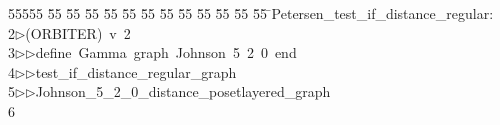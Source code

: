 %
%
\begin{tabbing}
55555 \= 55 \= 55 \= 55 \= 55 \= 55 \= 55 \= 55 \= 55 \= 55 \= 55 \= 55 \= 55 \= \>Petersen\_test\_if\_distance\_regular:\\[0pt]
2\>$\triangleright$\>(ORBITER)\ v\ 2\ \\[0pt]
3\>$\triangleright$\>$\triangleright$\>define\ Gamma\ graph\ Johnson\ 5\ 2\ 0\ end\ \\[0pt]
4\>$\triangleright$\>$\triangleright$\>test\_if\_distance\_regular\_graph\ \\[0pt]
5\>$\triangleright$\>$\triangleright$\>Johnson\_5\_2\_0\_distance\_posetlayered\_graph\\[0pt]
6\>\end{tabbing}
